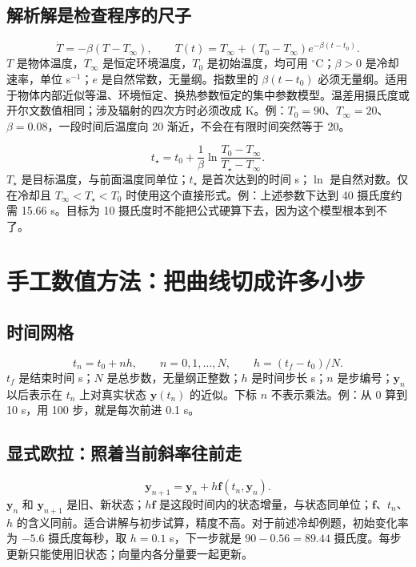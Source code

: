 \subsection{解析解是检查程序的尺子}
\begin{equation}
\dot T=-\beta(T-T_\infty),\qquad
T(t)=T_\infty+(T_0-T_\infty)e^{-\beta(t-t_0)}.
\end{equation}
$T$ 是物体温度，$T_\infty$ 是恒定环境温度，$T_0$ 是初始温度，均可用 $^\circ$C；$\beta>0$ 是冷却速率，单位 s$^{-1}$；$e$ 是自然常数，无量纲。指数里的 $\beta(t-t_0)$ 必须无量纲。适用于物体内部近似等温、环境恒定、换热参数恒定的集中参数模型。温差用摄氏度或开尔文数值相同；涉及辐射的四次方时必须改成 K。例：$T_0=90$、$T_\infty=20$、$\beta=0.08$，一段时间后温度向 20 渐近，不会在有限时间突然等于 20。

\begin{equation}
t_\star=t_0+\frac{1}{\beta}\ln\frac{T_0-T_\infty}{T_\star-T_\infty}.
\end{equation}
$T_\star$ 是目标温度，与前面温度同单位；$t_\star$ 是首次达到的时间 s；$\ln$ 是自然对数。仅在冷却且 $T_\infty<T_\star<T_0$ 时使用这个直接形式。例：上述参数下达到 40 摄氏度约需 15.66 s。目标为 10 摄氏度时不能把公式硬算下去，因为这个模型根本到不了。

\section{手工数值方法：把曲线切成许多小步}
\subsection{时间网格}
\begin{equation}
t_n=t_0+nh,\qquad n=0,1,\ldots,N,\qquad h=(t_f-t_0)/N.
\end{equation}
$t_f$ 是结束时间 s；$N$ 是总步数，无量纲正整数；$h$ 是时间步长 s；$n$ 是步编号；$\boldsymbol y_n$ 以后表示在 $t_n$ 上对真实状态 $\boldsymbol y(t_n)$ 的近似。下标 $n$ 不表示乘法。例：从 0 算到 10 s，用 100 步，就是每次前进 0.1 s。

\subsection{显式欧拉：照着当前斜率往前走}
\begin{equation}
\boldsymbol y_{n+1}=\boldsymbol y_n+h\boldsymbol f(t_n,\boldsymbol y_n).
\end{equation}
$\boldsymbol y_n$ 和 $\boldsymbol y_{n+1}$ 是旧、新状态；$h\boldsymbol f$ 是这段时间内的状态增量，与状态同单位；$\boldsymbol f$、$t_n$、$h$ 的含义同前。适合讲解与初步试算，精度不高。对于前述冷却例题，初始变化率为 $-5.6$ 摄氏度每秒，取 $h=0.1$ s，下一步就是 $90-0.56=89.44$ 摄氏度。每步更新只能使用旧状态；向量内各分量要一起更新。

